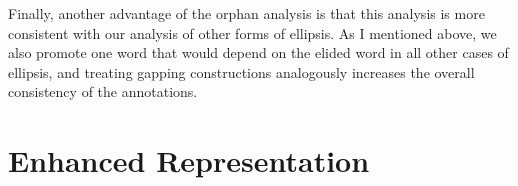 \documentclass[lucida,biblatex]{sp} %
\begin{document}

Finally, another advantage of the {\sc orphan} analysis is that this analysis is more consistent with 
our analysis of other forms of ellipsis. As I mentioned above, we also promote one word that would depend on the elided word in all other cases of ellipsis, and treating gapping constructions analogously increases the overall consistency of the annotations.

\section{Enhanced Representation}
\end{document}
